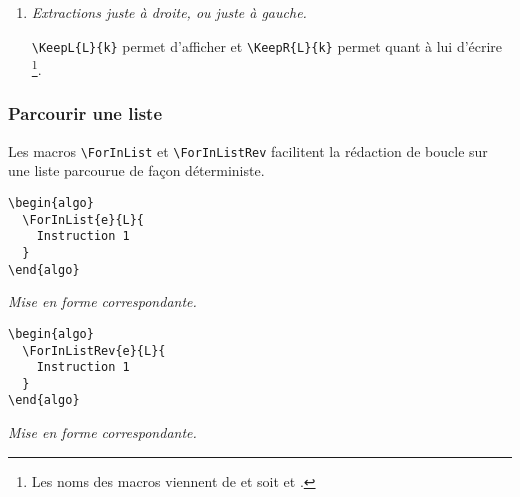 \documentclass[12pt,a4paper]{article}
\begin{document}
\begin{enumerate}
	\item \textit{Extractions juste à droite, ou juste à gauche.}

	      \verb+\KeepL{L}{k}+ permet d'afficher  et \verb++ permet quant à lui d'écrire \KeepR{L}{k}
	      \footnote{
	      	Les noms des macros viennent de  et  soit  et .
		  }.
\end{enumerate}



\subsubsection{Parcourir une liste}

Les macros \verb+\ForInList+ et \verb+\ForInListRev+ facilitent la rédaction de boucle sur une liste parcourue de façon déterministe.


\begin{multicols}{2}
\centering
\begin{frame-gene}
\begin{verbatim}
\begin{algo}
  \ForInList{e}{L}{
    Instruction 1
  }
\end{algo}
\end{verbatim}
\end{frame-gene}
\vfill\null
\columnbreak
\textit{Mise en forme correspondante.}
\begin{algo}
\end{algo}
\vfill\null
\end{multicols}


\begin{multicols}{2}
\centering
\begin{frame-gene}
\begin{verbatim}
\begin{algo}
  \ForInListRev{e}{L}{
    Instruction 1
  }
\end{algo}
\end{verbatim}
\end{frame-gene}
\vfill\null
\columnbreak
\textit{Mise en forme correspondante.}
\begin{algo}
\end{algo}
\vfill\null
\end{multicols}
\end{document}
